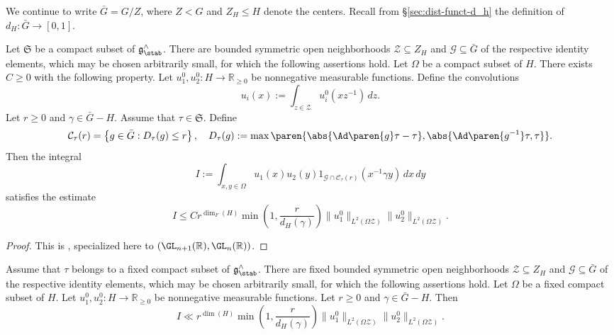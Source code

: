 We continue to write $\bar{G} = G / Z$, where $Z < G$ and $Z_H \leq H$ denote the centers.  Recall from \S\ref{sec:dist-funct-d_h} the definition of $d_H : \bar{G} \rightarrow [0,1]$.
\begin{theorem}\label{thm:bilinear-forms-cited}
  Let $\mathfrak{S}$ be a compact subset of $\mathfrak{g}^\wedge_{\stab}$.  There are bounded symmetric open neighborhoods $\mathcal{Z} \subseteq Z_H$ and $\mathcal{G} \subseteq \bar{G}$ of the respective identity elements, which may be chosen arbitrarily small, for which the following assertions hold.  Let $\Omega$ be a compact subset of $H$.  There exists $C \geq 0$ with the following property.  Let $u_1 ^0 , u_2 ^0 : H \rightarrow \mathbb{R}_{\geq 0}$ be nonnegative measurable functions.  Define the convolutions
  \begin{equation*}
    u_i(x) := \int_{z \in \mathcal{Z} } u_i^0 (x z^{-1}) \, d z.
  \end{equation*}
  Let $r \geq 0$ and $\gamma \in \bar{G} - H$.  Assume that $\tau \in \mathfrak{S}$.  Define
  \begin{equation*}
    \mathcal{C}_\tau(r) = \left\{ g \in \bar{G} : D_\tau(g) \leq r \right\},
    \quad
    D_\tau(g) := \max \paren{ \abs{\Ad \paren{g} \tau-\tau}, \abs{\Ad \paren{g^{-1}} \tau, \tau} }.
  \end{equation*}
  Then the integral
  \begin{equation*}
    I := \int_{x, y \in \Omega } u_1(x) u_2(y) 1_{\mathcal{G} \cap \mathcal{C}_\tau(r)}  (x^{-1} \gamma y) \,d x \, d y
  \end{equation*}
  satisfies the estimate
  \begin{equation}\label{eq:i-leq-c}
    I \leq C r^{\dim_F(H)} \min \left( 1, \frac{r}{ d_H(\gamma)} \right) \|u_1^0 \|_{L^2(\Omega \mathcal{Z} )} \|u_2^0 \|_{L^2(\Omega \mathcal{Z})}.
  \end{equation}
\end{theorem}
\begin{proof}
  This is \cite[Theorem 15.1]{2020arXiv201202187N}, specialized here to $(\GL_{n+1}(\mathbb{R}), \GL_n(\mathbb{R}))$.
\end{proof}
\begin{theorem}\label{thm:bilinear-forms-reformulated}
  Assume that $\tau$ belongs to a fixed compact subset of $\mathfrak{g}^\wedge_{\stab}$.  There are fixed bounded symmetric open neighborhoods $\mathcal{Z} \subseteq Z_H$ and $\mathcal{G} \subseteq \bar{G}$ of the respective identity elements, which may be chosen arbitrarily small, for which the following assertions hold.  Let $\Omega$ be a fixed compact subset of $H$.  Let $u_1 ^0 , u_2 ^0 : H \rightarrow \mathbb{R}_{\geq 0}$ be nonnegative measurable functions.  Let $r \geq 0$ and $\gamma \in \bar{G} - H$.  Then
  \begin{equation}\label{eq:i-ll-rdim_fh}
    I \ll r^{\dim(H)} \min \left( 1, \frac{r}{ d_H(\gamma)} \right) \|u_1^0 \|_{L^2(\Omega \mathcal{Z} )} \|u_2^0 \|_{L^2(\Omega \mathcal{Z})}.
  \end{equation}
\end{theorem}
